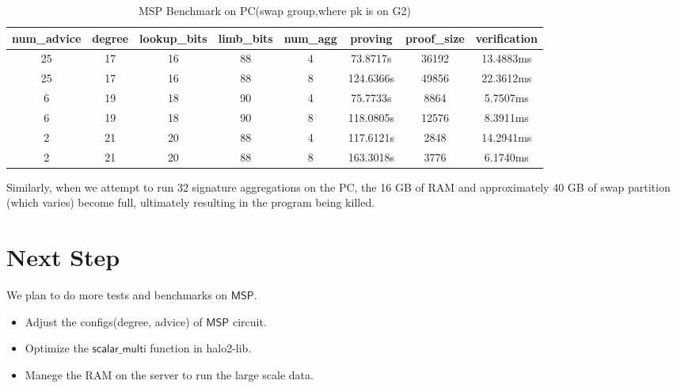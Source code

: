 \documentclass{article}
\begin{document}
\begin{table}[ht]
    \centering
    \begin{tabular}{c|c|c|c|c|c|c|c}
        \toprule
        num\_advice & degree & lookup\_bits & limb\_bits  & num\_agg  & proving & proof\_size & verification \\
        \midrule
        25 & 17 & 16 & 88  & 4   & 73.8717s   & 36192 & 13.4883ms \\
        25 & 17 & 16 & 88  & 8  & 124.6366s  & 49856 & 22.3612ms \\
        6  & 19 & 18 & 90  & 4   & 75.7733s      & 8864  & 5.7507ms   \\
        6  & 19 & 18 & 90  & 8   & 118.0805s  & 12576 & 8.3911ms  \\
        2  & 21 & 20 & 88  & 4   & 117.6121s  & 2848  & 14.2941ms \\
        2  & 21 & 20 & 88  & 8  & 163.3018s   & 3776  & 6.1740ms  \\
        \bottomrule
    \end{tabular}
    \caption{MSP Benchmark on PC(swap group,where pk is on G2)}
    \label{tab:data_table}
\end{table}


Similarly, when we attempt to run 32 signature aggregations on the PC, the 16 GB of RAM and approximately 40 GB of swap partition (which varies) become full, ultimately resulting in the program being killed.

\section{Next Step}

We plan to do more tests and benchmarks on $\mathsf{MSP}$.

\begin{itemize}
    \item Adjust the configs(degree, advice) of $\mathsf{MSP}$ circuit.
    \item Optimize the $\mathsf{scalar\_multi}$ function in halo2-lib.
    \item Manege the RAM on the server to run the large scale data.
\end{itemize}
\end{document}
